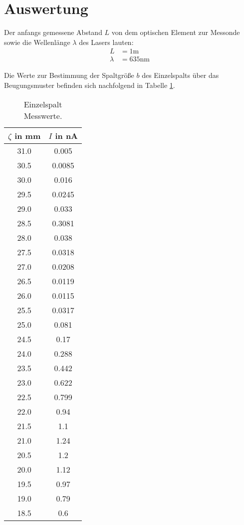 \section{Auswertung}
\label{sec:Auswertung}

Der anfangs gemessene Abstand $L$ von dem optischen Element zur Messonde sowie die Wellenlänge $\lambda$ des Lasers lauten:
\begin{align*}
  L &= 1 \text{m} \\
  \lambda &= 635 \text{nm}
\end{align*}

Die Werte zur Bestimmung der Spaltgröße $b$ des Einzelspalts über das Beugungsmuster befinden sich nachfolgend in Tabelle \ref{tab:einzel}.

\begin{table}
  \centering
  \caption{Einzelspalt Messwerte.}
  \label{tab:einzel}
\begin{tabular}{c c}
  \toprule
  $\zeta$ in mm & $I$ in nA \\
  \midrule
  31.0  &  0.005 \\
  30.5  &  0.0085 \\
  30.0  &  0.016 \\
  29.5  &  0.0245 \\
  29.0  &  0.033 \\
  28.5  &  0.3081 \\
  28.0  &  0.038 \\
  27.5  &  0.0318 \\
  27.0  &  0.0208 \\
  26.5  &  0.0119 \\
  26.0  &  0.0115 \\
  25.5  &  0.0317 \\
  25.0  &  0.081 \\
  24.5  &  0.17 \\
  24.0  &  0.288 \\
  23.5  &  0.442 \\
  23.0  &  0.622 \\
  22.5  &  0.799 \\
  22.0  &  0.94 \\
  21.5  &  1.1 \\
  21.0  &  1.24 \\
  20.5  &  1.2 \\
  20.0  &  1.12 \\
  19.5  &  0.97 \\
  19.0  &  0.79 \\
  18.5  &  0.6 \\

\end{tabular}
\end{table}
